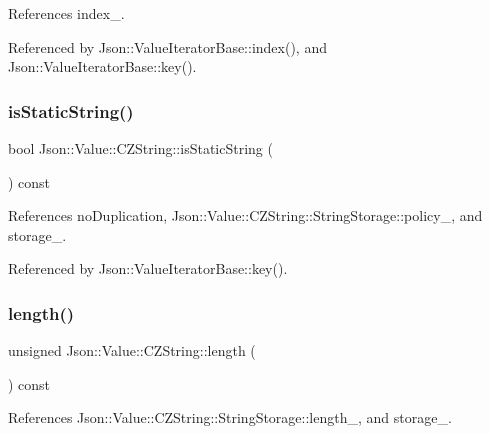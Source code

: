 References index\+\_\+.



Referenced by Json\+::\+Value\+Iterator\+Base\+::index(), and Json\+::\+Value\+Iterator\+Base\+::key().

\mbox{\label{classJson_1_1Value_1_1CZString_a5991dfa2f6c2ba318373c7429fcd7a57_a5991dfa2f6c2ba318373c7429fcd7a57}} 
\subsubsection{\texorpdfstring{is\+Static\+String()}{isStaticString()}}
{\footnotesize\ttfamily bool Json\+::\+Value\+::\+C\+Z\+String\+::is\+Static\+String (\begin{DoxyParamCaption}{ }\end{DoxyParamCaption}) const}



References no\+Duplication, Json\+::\+Value\+::\+C\+Z\+String\+::\+String\+Storage\+::policy\+\_\+, and storage\+\_\+.



Referenced by Json\+::\+Value\+Iterator\+Base\+::key().

\mbox{\label{classJson_1_1Value_1_1CZString_aa7ee665d162c1f33b3ec818e289d8a5e_aa7ee665d162c1f33b3ec818e289d8a5e}} 
\subsubsection{\texorpdfstring{length()}{length()}}
{\footnotesize\ttfamily unsigned Json\+::\+Value\+::\+C\+Z\+String\+::length (\begin{DoxyParamCaption}{ }\end{DoxyParamCaption}) const}



References Json\+::\+Value\+::\+C\+Z\+String\+::\+String\+Storage\+::length\+\_\+, and storage\+\_\+.



